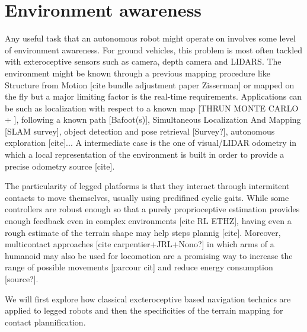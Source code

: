 \section{Environment awareness}
Any useful task that an autonomous robot might operate on involves some level of environment awareness. For ground vehicles, 
this problem is most often tackled with exteroceptive sensors such as camera, depth camera and LIDARS.
The environment might be known through a previous mapping procedure like Structure from Motion [cite bundle adjustment paper Zisserman] or mapped on the fly but a major limiting 
factor is the real-time requirements. Applications can be such as localization with respect to a known map [THRUN MONTE CARLO + ],
following a known path [Bafoot(s)], Simultaneous Localization And Mapping [SLAM survey], object detection and pose retrieval [Survey?], 
autonomous exploration [cite]... A intermediate case is the one of visual/LIDAR odometry in which a local representation of the environment is built
in order to provide a precise odometry source [cite]. 

The particularity of legged platforms is that they interact through intermitent contacts to move themselves, usually using predifined cyclic gaits. While some controllers are 
robust enough so that a purely proprioceptive estimation provides enough feedback even in complex environments [cite RL ETHZ], having even a rough estimate of 
the terrain shape may help steps plannig [cite]. Moreover, multicontact approaches [cite carpentier+JRL+Nono?] in which arms of a humanoid may also be used 
for locomotion are a promising way to increase the range of possible movements [parcour cit] and reduce energy consumption [source?]. 

We will first explore how classical excteroceptive based navigation technics are applied to legged robots and then the specificities of the 
terrain mapping for contact plannification.

